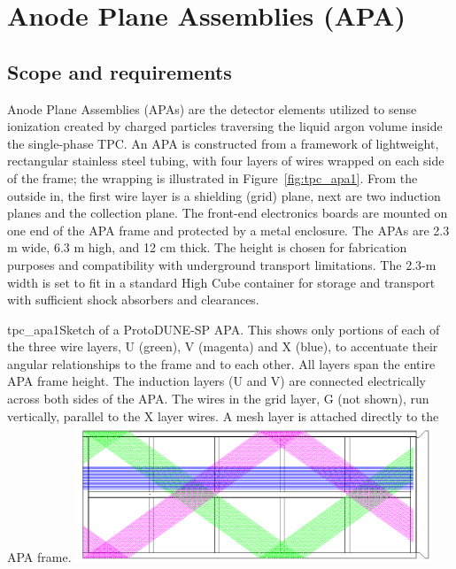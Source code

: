 
\section{Anode Plane Assemblies (APA)}

\subsection{Scope and requirements}

Anode Plane Assemblies (APAs) are the detector elements utilized to sense ionization created by charged particles traversing the liquid argon volume inside the single-phase TPC.  
An APA is constructed from a framework of lightweight, rectangular stainless steel tubing, with
four layers of wires wrapped on each side of the frame; the wrapping is illustrated in  Figure~\ref{fig:tpc_apa1}. From the outside in, the first wire layer
is a shielding (grid) plane, next are two induction planes and the collection plane. The front-end
electronics boards are mounted on one end of the APA frame and protected by a metal enclosure.
The APAs are 2.3 m wide, 6.3 m high, and 12 cm thick. The height is chosen for fabrication
purposes and compatibility with underground transport limitations. The 2.3-m width is set to fit
in a standard High Cube container for storage and transport with sufficient shock absorbers and
clearances.

\begin{cdrfigure}{tpc_apa1}{Sketch of a ProtoDUNE-SP APA. This shows only portions of each of the three wire layers, U (green), V (magenta) and X (blue), to accentuate their angular relationships to the frame and to each other.  All layers span the entire APA frame height. The induction layers (U and V) are connected electrically across both sides of the APA.  The wires in the grid layer, G (not shown), run vertically, parallel to the X layer wires.  A mesh layer is attached directly to the APA frame.}
\includegraphics[width=0.8\textwidth, angle=90]{figures/tpc_apa1.png} 
\end{cdrfigure}


